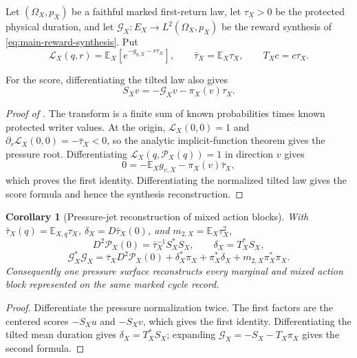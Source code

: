 \documentclass[11pt]{article}
\numberwithin{equation}{section}
\newtheorem{corollary}[corollary]{Corollary}
\theoremstyle{definition}
\theoremstyle{remark}
\begin{document}
Let $(\Omega_X,p_X)$ be a faithful marked first-return law, let
$\tau_X>0$ be the protected physical duration, and let
$\mathscr G_X:E_X\to L^2(\Omega_X,p_X)$ be the reward synthesis of
\eqref{eq:main-reward-synthesis}.  Put
\[
 \mathcal L_X(q,r)=\mathbb E_X[e^{-g_{q,X}-r\tau_X}],
 \qquad
 \bar\tau_X=\mathbb E_X\tau_X,
 \qquad
 T_Xc=c\tau_X.
\]


For the score, differentiating the tilted law also gives
\begin{equation}
 S_Xv=-\mathscr G_Xv-\pi_X(v)\tau_X.
 \label{eq:supp-pressure-score}
\end{equation}
\begin{proof}[Proof of ]
The transform is a finite sum of known probabilities times known protected
writer values.  At the origin, $\mathcal L_X(0,0)=1$ and
$\partial_r\mathcal L_X(0,0)=-\bar\tau_X<0$, so the analytic implicit-function
theorem gives the pressure root.  Differentiating
$\mathcal L_X(q,\mathcal P_X(q))=1$ in direction $v$ gives
\[
 0=-\mathbb E_Xg_{v,X}-\pi_X(v)\bar\tau_X,
\]
which proves the first identity.  Differentiating the normalized tilted law
gives the score formula and hence the synthesis reconstruction.
\end{proof}

\begin{corollary}[Pressure-jet reconstruction of mixed action blocks]
\label{cor:supp-pressure-jet}
With $\bar\tau_X(q)=\mathbb E_{X,q}\tau_X$,
$\delta_X=D\bar\tau_X(0)$, and
$m_{2,X}=\mathbb E_X\tau_X^2$,
\begin{equation}
 D^2\mathcal P_X(0)=\bar\tau_X^{-1}S_X^*S_X,\qquad
 \delta_X=T_X^*S_X,
 \label{eq:supp-pressure-jet-a}
\end{equation}
\begin{equation}
 \mathscr G_X^*\mathscr G_X
 =\bar\tau_XD^2\mathcal P_X(0)
 +\delta_X^*\pi_X+\pi_X^*\delta_X
 +m_{2,X}\pi_X^*\pi_X.
 \label{eq:supp-pressure-jet-b}
\end{equation}
Consequently one pressure surface reconstructs every marginal and mixed action
block represented on the same marked cycle record.
\end{corollary}

\begin{proof}
Differentiate the pressure normalization twice.  The first factors are the
centered scores $-S_Xu$ and $-S_Xv$, which gives the first identity.
Differentiating the tilted mean duration gives $\delta_X=T_X^*S_X$; expanding
$\mathscr G_X=-S_X-T_X\pi_X$ gives the second formula.
\end{proof}
\end{document}

